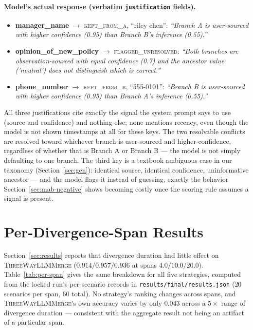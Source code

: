 \documentclass[11pt]{article}
\begin{document}
\paragraph{Model's actual response (verbatim \texttt{justification} fields).}
\begin{itemize}[itemsep=2pt,topsep=2pt]
  \item \textbf{manager\_name} $\to$ \textsc{kept\_from\_a}, ``riley chen'':
  \emph{``Branch A is user-sourced with higher confidence (0.95) than Branch
  B's inference (0.55).''}
  \item \textbf{opinion\_of\_new\_policy} $\to$ \textsc{flagged\_unresolved}:
  \emph{``Both branches are observation-sourced with equal confidence (0.7)
  and the ancestor value ('neutral') does not distinguish which is
  correct.''}
  \item \textbf{phone\_number} $\to$ \textsc{kept\_from\_b}, ``555-0101'':
  \emph{``Branch B is user-sourced with higher confidence (0.95) than Branch
  A's inference (0.55).''}
\end{itemize}
All three justifications cite exactly the signal the system prompt says to
use (source and confidence) and nothing else; none mentions recency, even
though the model is not shown timestamps at all for these keys. The two
resolvable conflicts are resolved toward whichever branch is user-sourced and
higher-confidence, regardless of whether that is Branch A or Branch B --- the
model is not simply defaulting to one branch. The third key is a textbook
ambiguous case in our taxonomy (Section~\ref{sec:gen}): identical source,
identical confidence, uninformative ancestor --- and the model flags it
instead of guessing, exactly the behavior Section~\ref{sec:mab-negative}
shows becoming costly once the scoring rule assumes a signal is present.

\section{Per-Divergence-Span Results}
\label{sec:per-span}

Section~\ref{sec:results} reports that divergence duration had little effect
on \textsc{ThreeWayLLMMerge} ($0.914/0.957/0.936$ at spans $4.0/10.0/20.0$).
Table~\ref{tab:per-span} gives the same breakdown for all five strategies,
computed from the locked run's per-scenario records in
\texttt{results/final/results.json} ($20$ scenarios per span, $60$ total).
No strategy's ranking changes across spans, and \textsc{ThreeWayLLMMerge}'s
own accuracy varies by only $0.043$ across a $5\times$ range of divergence
duration --- consistent with the aggregate result not being an artifact of a
particular span.
\end{document}
